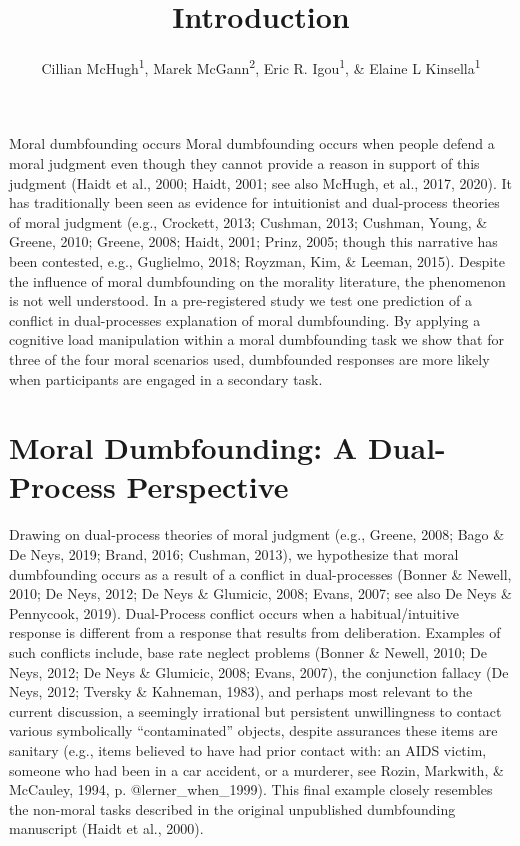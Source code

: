\documentclass[
  american,
  man,floatsintext]{apa7}
\title{Introduction}
\author{Cillian McHugh\textsuperscript{1}, Marek McGann\textsuperscript{2}, Eric R. Igou\textsuperscript{1}, \& Elaine L Kinsella\textsuperscript{1}}
\date{}
\affiliation{\vspace{0.5cm}\textsuperscript{1} University of Limerick\\\textsuperscript{2} Mary Immaculate College \textasciitilde{} University of Limerick}
\begin{document}
\maketitle

{
\setcounter{tocdepth}{3}
\tableofcontents
}
Moral dumbfounding occurs Moral dumbfounding occurs when people defend a moral judgment even though they cannot provide a reason in support of this judgment (Haidt et al., 2000; Haidt, 2001; see also McHugh, et al., 2017, 2020). It has traditionally been seen as evidence for intuitionist and dual-process theories of moral judgment (e.g., Crockett, 2013; Cushman, 2013; Cushman, Young, \& Greene, 2010; Greene, 2008; Haidt, 2001; Prinz, 2005; though this narrative has been contested, e.g., Guglielmo, 2018; Royzman, Kim, \& Leeman, 2015). Despite the influence of moral dumbfounding on the morality literature, the phenomenon is not well understood. In a pre-registered study we test one prediction of a conflict in dual-processes explanation of moral dumbfounding. By applying a cognitive load manipulation within a moral dumbfounding task we show that for three of the four moral scenarios used, dumbfounded responses are more likely when participants are engaged in a secondary task.

\hypertarget{moral-dumbfounding-a-dual-process-perspective}{%
\section{Moral Dumbfounding: A Dual-Process Perspective}\label{moral-dumbfounding-a-dual-process-perspective}}

Drawing on dual-process theories of moral judgment (e.g., Greene, 2008; Bago \& De Neys, 2019; Brand, 2016; Cushman, 2013), we hypothesize that moral dumbfounding occurs as a result of a conflict in dual-processes (Bonner \& Newell, 2010; De Neys, 2012; De Neys \& Glumicic, 2008; Evans, 2007; see also De Neys \& Pennycook, 2019). Dual-Process conflict occurs when a habitual/intuitive response is different from a response that results from deliberation. Examples of such conflicts include, base rate neglect problems (Bonner \& Newell, 2010; De Neys, 2012; De Neys \& Glumicic, 2008; Evans, 2007), the conjunction fallacy (De Neys, 2012; Tversky \& Kahneman, 1983), and perhaps most relevant to the current discussion, a seemingly irrational but persistent unwillingness to contact various symbolically \enquote{contaminated} objects, despite assurances these items are sanitary (e.g., items believed to have had prior contact with: an AIDS victim, someone who had been in a car accident, or a murderer, see Rozin, Markwith, \& McCauley, 1994, p. @lerner\_when\_1999). This final example closely resembles the non-moral tasks described in the original unpublished dumbfounding manuscript (Haidt et al., 2000).
\end{document}
